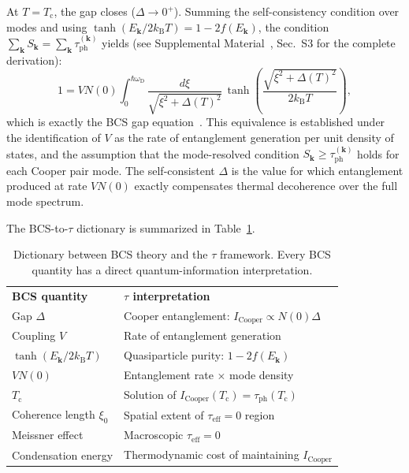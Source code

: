 \documentclass[prb,twocolumn,superscriptaddress,longbibliography,floatfix]{revtex4-2}
\newcommand{\kB}{k_{\mathrm{B}}}
\newcommand{\tauasym}{\tau}
\newcommand{\taueff}{\tauasym_{\mathrm{eff}}}
\newcommand{\taudec}{\tauasym_{\mathrm{ph}}}
\newcommand{\Icoop}{I_{\mathrm{Cooper}}}
\newcommand{\Tc}{T_{\mathrm{c}}}
\newcommand{\oD}{\omega_{\mathrm{D}}}
\newcommand{\Ek}{E_{\bm{k}}}
\begin{document}
At $T = \Tc$, the gap closes ($\Delta \to 0^+$).
Summing the self-consistency condition over modes and using
$\tanh(\Ek/2\kB T) = 1 - 2f(\Ek)$, the condition
$\sum_{\bm{k}} S_{\bm{k}} = \sum_{\bm{k}} \taudec^{(\bm{k})}$
yields (see Supplemental Material~\cite{supplement}, Sec.~S3
for the complete derivation):
\begin{equation}\label{eq:bcs_gap}
  1 = V N(0) \int_0^{\hbar\oD}
  \frac{d\xi}{\sqrt{\xi^2 + \Delta(T)^2}}\,
  \tanh\!\left(\frac{\sqrt{\xi^2 + \Delta(T)^2}}{2\kB T}\right),
\end{equation}
which is exactly the BCS gap equation~\cite{BCS1957}.  This
equivalence is established under the identification of $V$ as
the rate of entanglement generation per unit density of states,
and the assumption that the mode-resolved condition
$S_{\bm{k}} \geq \taudec^{(\bm{k})}$ holds for each Cooper pair
mode.  The self-consistent $\Delta$ is the value for which
entanglement produced at rate $VN(0)$ exactly compensates thermal
decoherence over the full mode spectrum.

The BCS-to-$\tauasym$ dictionary is summarized in
Table~\ref{tab:dictionary}.

\begin{table}[t]
\caption{\label{tab:dictionary}Dictionary between BCS theory
and the $\tauasym$ framework.  Every BCS quantity has a
direct quantum-information interpretation.}
\begin{ruledtabular}
\begin{tabular}{ll}
\textbf{BCS quantity} & \textbf{$\tauasym$ interpretation} \\
\colrule
Gap $\Delta$ & Cooper entanglement: $\Icoop \propto N(0)\Delta$ \\
Coupling $V$ & Rate of entanglement generation \\
$\tanh(\Ek/2\kB T)$ & Quasiparticle purity: $1 - 2f(\Ek)$ \\
$VN(0)$ & Entanglement rate $\times$ mode density \\
$\Tc$ & Solution of $\Icoop(\Tc) = \taudec(\Tc)$ \\
Coherence length $\xi_0$ & Spatial extent of $\taueff = 0$ region \\
Meissner effect & Macroscopic $\taueff = 0$ \\
Condensation energy & Thermodynamic cost of maintaining $\Icoop$ \\
\end{tabular}
\end{ruledtabular}
\end{table}
\end{document}
